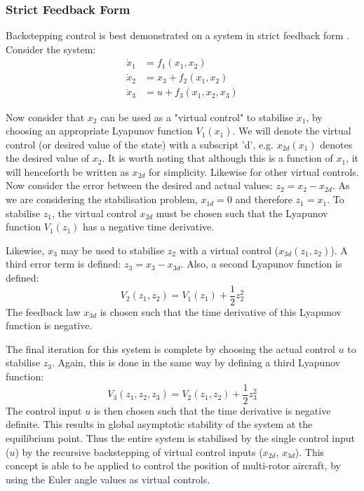 \subsubsection{Strict Feedback Form}
Backstepping control is best demonstrated on a system in strict feedback form \cite{1992a}. Consider the system:
\begin{equation*}
\begin{split}
\dot{x}_{1}&=f_{1}(x_{1},x_{2})\\
\dot{x}_{2}&=x_{3}+f_{2}(x_{1},x_{2})\\
\dot{x}_{3}&=u +f_{3}(x_{1},x_{2}, x_{3})
\end{split}
\end{equation*}

Now consider that $x_{2}$ can be used as a "virtual control" to stabilise $\dot{x}_{1}$, by choosing an appropriate Lyapunov function $V_{1}(x_{1})$. We will denote the virtual control (or desired value of the state) with a subscript 'd', e.g. $x_{2d}(x_{1})$ denotes the desired value of $x_{2}$. It is worth noting that although this is a function of $x_{1}$, it will henceforth be written as $x_{2d}$ for simplicity. Likewise for other virtual controls.  Now consider the error between the desired and actual values: $z_{2}=x_{2}-x_{2d}$. As we are considering the stabilisation problem, $x_{1d}=0$ and therefore $z_{1}=x_{1}$. To stabilise $z_{1}$, the virtual control $x_{2d}$ must be chosen such that the Lyapunov function $V_{1}(z_{1})$ has a negative time derivative.

Likewise, $x_{3}$ may be used to stabilise $z_{2}$ with a virtual control ($x_{3d}(z_{1},z_{2})$). A third error term is defined: $z_{3}=x_{3}-x_{3d}$. Also, a second Lyapunov function is defined: 
\begin{equation*}
V_{2}(z_{1},z_{2})=V_{1}(z_{1})+\frac{1}{2}z_{2}^{2}
\end{equation*}
The feedback law $x_{3d}$ is chosen such that the time derivative of this Lyapunov function is negative. 

The final iteration for this system is complete by choosing the actual control $u$ to stabilise $z_{3}$. Again, this is done in the same way by defining a third Lyapunov function:
\begin{equation*}
V_{3}(z_{1},z_{2},z_{3})=V_{2}(z_{1},z_{2})+\frac{1}{2}z_{3}^{2}
\end{equation*}
The control input $u$ is then chosen such that the time derivative is negative definite. This results in global asymptotic stability of the system at the equilibrium point. Thus the entire system is stabilised by the single control input ($u$) by the recursive backstepping of virtual control inputs ($x_{2d}$, $x_{3d}$). This concept is able to be applied to control the position of multi-rotor aircraft, by using the Euler angle values as virtual controls.


